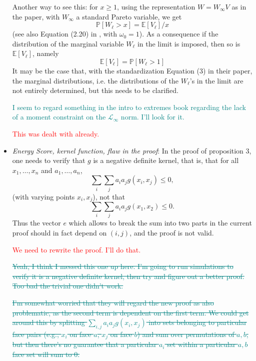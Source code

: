 \documentclass[10pt]{article}
\newcommand{\comment}[1]{\textcolor{teal}{#1}}
\newcommand{\bruno}[1]{\textcolor{red}{#1}}
\begin{document}
\begin{itemize}
    Another way to see this: for $x \geq 1$, using the representation $W = W_{\infty}V$ as in the
    paper, with $W_{\infty}$ a standard Pareto variable, we get 
    \[\mathbb{P}\left[W_{\ell} > x\right] = \mathbb{E}\left[V_{\ell}\right] / x\]
    (see also Equation (2.20) in \cite{ferreira2014}, with $\omega_0 = 1$).  As a consequence if 
    the distribution of the marginal variable $W_{\ell}$ in the limit is imposed, then so is 
    $\mathbb{E}\left[V_{\ell}\right]$, namely 
    \[ \mathbb{E}\left[V_{\ell}\right] = \mathbb{P}\left[W_{\ell} > 1\right] \]
    It may be the case that, with the standardization Equation (3) in their paper, the marginal
    distributions, i.e. the distributions of the $W_{\ell}$’s in the limit are not entirely determined, 
    but this needs to be clarified.

    \comment{I seem to regard something in the intro to extremes book regarding the lack of a
    moment constraint on the $\mathcal{L}_{\infty}$ norm.  I'll look for it.}

    \bruno{This was dealt with already.}

    \item \emph{Energy Score, kernel function, flaw in the proof}: In the proof of proposition 3, 
    one needs to verify that $g$ is a negative definite kernel, that is, that for all $x_1,\ldots,x_n$
    and $a_1,\ldots,a_n$, \[ \sum_i\sum_ja_ia_jg(x_i,x_j)\leq 0,\]
    (with varying points $x_i,x_j$), not that \[\sum_i\sum_ja_ia_jg(x_1,x_2)\leq 0.\]  Thus the vector $e$
    which allows to break the sum into two parts in the current proof should in fact depend on $(i,j)$, 
    and the proof is not valid.

    \bruno{We need to rewrite the proof. I'll do that.}

    \comment{\st{Yeah, I think I messed this one up here.  I'm going to run simulations to verify it is
    a negative definite kernel, then try and figure out a better proof.  Too bad the trivial one
    didn't work.}}

    \comment{\st{I'm somewhat worried that they will regard the new proof as also problematic, as the second 
    term is dependent on the first term.  We could get around this by splitting $\sum_{i,j}a_ia_jg(x_i,x_j)$ 
    into sets belonging to particular face pairs (e.g., $x_i$ on face $a$, $x_j$ on face $b$) and sum over 
    permutations of $a,b$, but then there's no guarantee that a particular $a_i$ set within a particular 
    $a,b$ face set will sum to 0.}}


\end{itemize}
\end{document}
